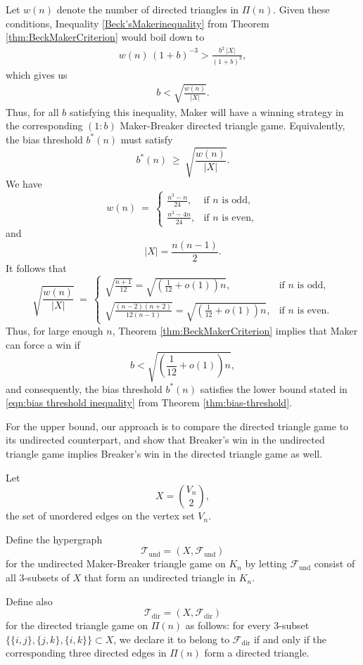 \documentclass{article}
\theoremstyle{definition}
\theoremstyle{plain}
\theoremstyle{remark}
\theoremstyle{definition}
\begin{document}
Let $w(n)$ denote the number of directed triangles in $\Pi(n)$. 
Given these conditions, Inequality \ref{Beck'sMakerinequality} from Theorem \ref{thm:BeckMakerCriterion} would boil down to
\begin{align}
    w(n)\,(1+b)^{-3}  >  \frac{b^2\,|X|}{(1+b)^3},
 \end{align}
which gives us
\begin{align}
    b  <  \sqrt{\frac{w(n)}{|X|}}.\label{eqn:1}
\end{align}
Thus, for all $b$ satisfying this inequality, Maker will have a winning strategy in the corresponding $(1:b)$ Maker-Breaker directed triangle game. Equivalently, the bias threshold $b^*(n)$ must satisfy
\[
b^*(n) \ \ge\  \sqrt{\frac{w(n)}{|X|}}.
\]
We have 
\[
w(n)
\ =\ 
\begin{cases}
\displaystyle \frac{n^3 - n}{24}, & \text{if $n$ is odd},\\[6pt]
\displaystyle \frac{n^3 - 4n}{24}, & \text{if $n$ is even},
\end{cases}
\]
and
\[
|X| = \frac{n(n-1)}{2}.
\]
It follows that
\[
\sqrt{\frac{w(n)}{|X|}}
\ =\ 
\begin{cases}
\displaystyle \sqrt{\frac{n+1}{12}} = \displaystyle \sqrt{\left(\frac{1}{12} +o(1)\right)n}, & \text{if $n$ is odd},\\[6pt]
\displaystyle \sqrt{\frac{(n-2)(n+2)}{12(n-1)}} = \displaystyle \sqrt{ \left(\frac{1}{12} +o(1)\right)n}, & \text{if $n$ is even.}
\end{cases}
\]
Thus, for large enough $n$, Theorem \ref{thm:BeckMakerCriterion} implies that Maker can force a win if
\[
b < \sqrt{\left(\frac{1}{12} +o(1)\right)n},
\]
and consequently, the bias threshold $b^*(n)$ satisfies the lower bound stated in \eqref{eqn:bias threshold inequality} from Theorem \ref{thm:bias-threshold}.

For the upper bound, our approach is to compare the directed triangle game to its undirected counterpart, and show that Breaker's win in the undirected triangle game implies Breaker's win in the directed triangle game as well.

Let
\[
X=\binom{V_n}{2},
\]
the set of unordered edges on the vertex set $V_n$.

Define the hypergraph
\[
\mathcal T_{\mathrm{und}}=(X,\mathcal F_{\mathrm{und}})
\]
for the undirected Maker-Breaker triangle game on $K_n$ by letting
$\mathcal F_{\mathrm{und}}$ consist of all $3$-subsets of $X$ that form an undirected triangle in $K_n$.

Define also
\[
\mathcal T_{\mathrm{dir}}=(X,\mathcal F_{\mathrm{dir}})
\]
for the directed triangle game on $\Pi(n)$ as follows:
for every $3$-subset $\{\{i,j\},\{j,k\},\{i,k\}\}\subset X$, we declare it to belong to
$\mathcal F_{\mathrm{dir}}$ if and only if the corresponding three directed edges in $\Pi(n)$ form a directed triangle.
\end{document}
